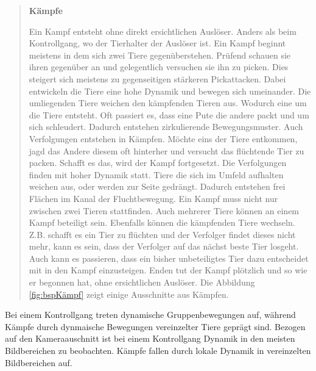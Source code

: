 
\par

\begin{quote}
\textbf{Kämpfe}\par
Ein Kampf entsteht ohne direkt ersichtlichen Auslöser. Anders als beim Kontrollgang, wo der Tierhalter der Auslöser ist. Ein Kampf beginnt meistens in dem sich zwei Tiere gegenüberstehen. Prüfend schauen sie ihren gegenüber an und gelegentlich versuchen sie ihn zu picken. Dies steigert sich meistens zu gegenseitigen stärkeren Pickattacken. Dabei entwickeln die Tiere eine hohe Dynamik und bewegen sich umeinander. Die umliegenden Tiere weichen den kämpfenden Tieren aus. Wodurch eine  um die Tiere entsteht. Oft passiert es, dass eine Pute die andere packt und um sich schleudert. Dadurch entstehen zirkulierende Bewegungsmuster. Auch Verfolgungen entstehen in Kämpfen. Möchte eins der Tiere entkommen, jagd das Andere diesem oft hinterher und versucht das flüchtende Tier zu packen. Schafft es das, wird der Kampf fortgesetzt. Die Verfolgungen finden mit hoher Dynamik statt. Tiere die sich im Umfeld aufhalten weichen aus, oder werden zur Seite gedrängt. Dadurch entstehen frei Flächen im Kanal der Fluchtbewegung. Ein Kampf muss nicht nur zwischen zwei Tieren stattfinden. Auch mehrerer Tiere können an einem Kampf beteiligt sein. Ebenfalls können die kämpfenden Tiere wechseln. Z.B. schafft es ein Tier zu flüchten und der Verfolger findet dieses nicht mehr, kann es sein, dass der Verfolger auf das nächst beste Tier losgeht. Auch kann es passieren, dass ein bisher unbeteiligtes Tier dazu entscheidet mit in den Kampf einzusteigen. Enden tut der Kampf plötzlich und so wie er begonnen hat, ohne ersichtlichen Auslöser. Die Abbildung \ref{fig:bspKämpf} zeigt einige Ausschnitte aus Kämpfen.
\end{quote}


\par

Bei einem Kontrollgang treten dynamische Gruppenbewegungen auf, während Kämpfe durch dynmaische Bewegungen vereinzelter Tiere geprägt sind. Bezogen auf den Kameraauschnitt ist bei einem Kontrollgang Dynamik in den meisten Bildbereichen zu beobachten. Kämpfe fallen durch lokale Dynamik in vereinzelten Bildbereichen auf. \par

